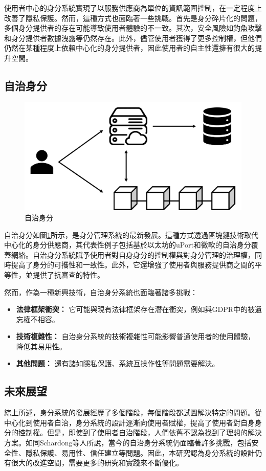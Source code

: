 使用者中心的身分系統實現了以服務供應商為單位的資訊範圍控制，在一定程度上改善了隱私保護。然而，這種方式也面臨著一些挑戰。首先是身分碎片化的問題，多個身分提供者的存在可能導致使用者體驗的不一致。其次，安全風險如釣魚攻擊和身分提供者數據洩露等仍然存在\cite{sun2012devil}。此外，儘管使用者獲得了更多控制權，但他們仍然在某種程度上依賴中心化的身分提供者，因此使用者的自主性還擁有很大的提升空間\cite{allen2016selfsovereign}。
\subsection{自治身分}
\begin{figure}
  \centering
  \includegraphics[width=\linewidth,keepaspectratio]{figures/self-sovereign-identity.png}
  \caption{自治身分}
  \label{fig:self-sovereign-identity}
\end{figure}
自治身分如圖\ref{fig:self-sovereign-identity}所示，是身分管理系統的最新發展\cite{preukschat2021self}。這種方式透過區塊鏈技術取代中心化的身分供應商，其代表性例子包括基於以太坊的uPort和微軟的自治身分覆蓋網絡\cite{lundkvist2017uport, microsoft2020ion}。自治身分系統賦予使用者對自身身分的控制權與對身分管理的治理權，同時提高了身分的可攜性和一致性。此外，它還增強了使用者與服務提供商之間的平等性，並提供了抗審查的特性。

然而，作為一種新興技術，自治身分系統也面臨著諸多挑戰\cite{s22155641}：
\begin{itemize}
  \item \textbf{法律框架衝突：} 它可能與現有法律框架存在潛在衝突，例如與GDPR中的被遺忘權不相容\cite{finck2018blockchains}。
  \item \textbf{技術複雜性：} 自治身分系統的技術複雜性可能影響普通使用者的使用體驗，降低其易用性\cite{kubach2020self}。
  \item \textbf{其他問題：} 還有諸如隱私保護、系統互操作性等問題需要解決。
\end{itemize}
\subsection{未來展望}
綜上所述，身分系統的發展經歷了多個階段，每個階段都試圖解決特定的問題。從中心化到使用者自治，身分系統的設計逐漸向使用者賦權，提高了使用者對自身身分的控制權。但是，即使到了使用者自治階段，人們依舊不認為找到了理想的解決方案。如同Schardong等人\cite{s22155641,soltani2021surveydid}所說，當今的自治身分系統仍面臨著許多挑戰，包括安全性、隱私保護、易用性、信任建立等問題。因此，本研究認為身分系統的設計仍有很大的改進空間，需要更多的研究和實踐來不斷優化。
